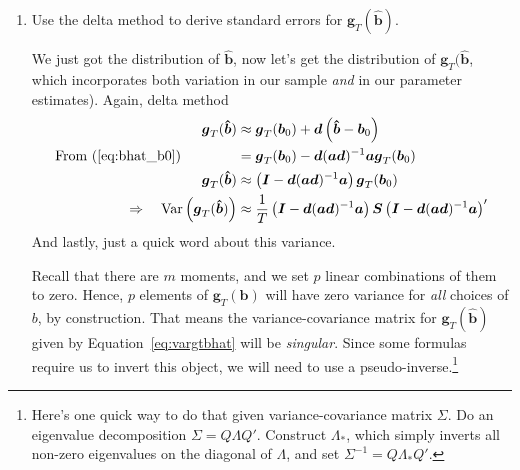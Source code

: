 \documentclass[12pt]{article}
\theoremstyle{plain}
\theoremstyle{definition}
\theoremstyle{remark}
\begin{document}
\begin{enumerate}
  \item Use the delta method to derive standard errors for
    $\boldsymbol{g}_T(\boldsymbol{\hat{b}})$.

    We just got the distribution of $\boldsymbol{\hat{b}}$, now let's
    get the distribution of $\boldsymbol{g}_T(\boldsymbol{\hat{b}}$,
    which incorporates both variation in our sample \emph{and} in our
    parameter estimates). Again, delta method
    \begin{align}
      \boldsymbol{g}_T(\boldsymbol{\hat{b}})
      &\approx
      \boldsymbol{g}_T(\boldsymbol{b}_0)
      + \boldsymbol{d}
      \left(\boldsymbol{\hat{b}}-\boldsymbol{b}_0\right)\notag\\
      \text{From (\ref{eq:bhat_b0})}
      \qquad\qquad
      &=
      \boldsymbol{g}_T(\boldsymbol{b}_0)
      -\boldsymbol{d}(\boldsymbol{a} \boldsymbol{d})^{-1}
      \boldsymbol{a} \boldsymbol{g}_T(\boldsymbol{b}_0)\notag \\
      \boldsymbol{g}_T(\boldsymbol{\hat{b}})
      &\approx
      \left(\boldsymbol{I}
      -\boldsymbol{d}(\boldsymbol{a} \boldsymbol{d})^{-1}
      \boldsymbol{a} \right)
      \boldsymbol{g}_T(\boldsymbol{b}_0)\notag\\
      \Rightarrow\quad
      \text{Var}\left(
      \boldsymbol{g}_T(\boldsymbol{\hat{b}})
      \right)
      &\approx
      \frac{1}{T}
      \left(\boldsymbol{I}
      -\boldsymbol{d}(\boldsymbol{a} \boldsymbol{d})^{-1}
      \boldsymbol{a} \right)
      \boldsymbol{S}
      \left(\boldsymbol{I}
      -\boldsymbol{d}(\boldsymbol{a} \boldsymbol{d})^{-1}
      \boldsymbol{a} \right)'
      \label{eq:vargtbhat}
    \end{align}
    And lastly, just a quick word about this variance.

    Recall that there are $m$ moments, and we set $p$ linear
    combinations of them to zero. Hence, $p$ elements of
    $\boldsymbol{g}_T(\boldsymbol{b})$ will have zero variance
    for \emph{all} choices of $b$, by construction. That means the
    variance-covariance matrix for
    $\boldsymbol{g}_T(\boldsymbol{\hat{b}})$ given by
    Equation~\ref{eq:vargtbhat} will be \emph{singular}.  Since some
    formulas require us to invert this object, we will need to use a
    pseudo-inverse.\footnote{Here's one quick way to do that given
      variance-covariance matrix $\Sigma$. Do an eigenvalue
      decomposition $\Sigma = Q\Lambda Q'$. Construct $\Lambda_*$, which
      simply inverts all non-zero eigenvalues on the diagonal of
      $\Lambda$, and set $\Sigma^{-1}=Q\Lambda_*Q'$.}

\end{enumerate}
\end{document}
